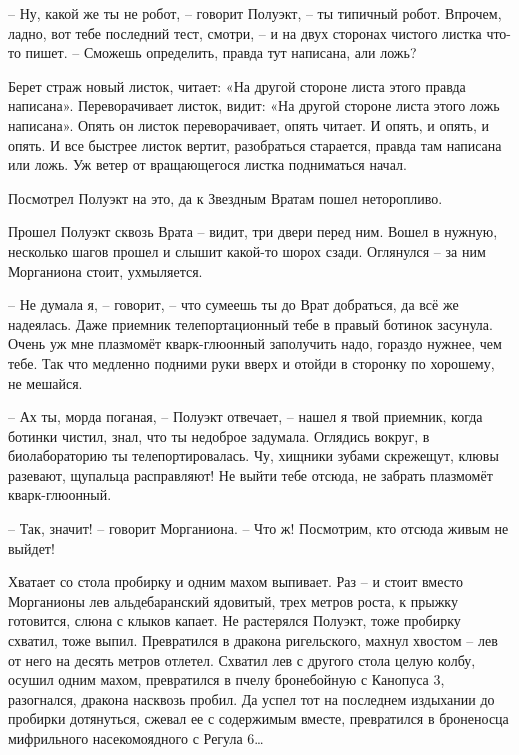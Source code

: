 \documentclass[ebook,oneside,final,openright]{memoir}
\begin{document}
– Ну, какой же ты не робот, – говорит Полуэкт, – ты типичный робот. Впрочем, ладно, вот тебе последний тест, смотри, – и на двух сторонах чистого листка что-то пишет. – Сможешь определить, правда тут написана, али ложь? \par
\par
Берет страж новый листок, читает: «На другой стороне листа этого правда написана». Переворачивает листок, видит: «На другой стороне листа этого ложь написана». Опять он листок переворачивает, опять читает. И опять, и опять, и опять. И все быстрее листок вертит, разобраться старается, правда там написана или ложь. Уж ветер от вращающегося листка подниматься начал. \par
\par
Посмотрел Полуэкт на это, да к Звездным Вратам пошел неторопливо.\par
\par
\par
Прошел Полуэкт сквозь Врата – видит, три двери перед ним. Вошел в нужную, несколько шагов прошел и слышит какой-то шорох сзади. Оглянулся – за ним Морганиона стоит, ухмыляется. \par
\par
– Не думала я, – говорит, – что сумеешь ты до Врат добраться, да всё же надеялась. Даже приемник телепортационный тебе в правый ботинок засунула. Очень уж мне плазмомёт кварк-глюонный заполучить надо, гораздо нужнее, чем тебе. Так что медленно подними руки вверх и отойди в сторонку по хорошему, не мешайся.\par
– Ах ты, морда поганая, – Полуэкт отвечает, – нашел я твой приемник, когда ботинки чистил, знал, что ты недоброе задумала. Оглядись вокруг, в биолабораторию ты телепортировалась. Чу, хищники зубами скрежещут, клювы разевают, щупальца расправляют! Не выйти тебе отсюда, не забрать плазмомёт кварк-глюонный.\par
– Так, значит! – говорит Морганиона. – Что ж! Посмотрим, кто отсюда живым не выйдет!\par
\par
Хватает со стола пробирку и одним махом выпивает. Раз – и стоит вместо Морганионы лев альдебаранский ядовитый, трех метров роста, к прыжку готовится, слюна с клыков капает. Не растерялся Полуэкт, тоже пробирку схватил, тоже выпил. Превратился в дракона ригельского, махнул хвостом – лев от него на десять метров отлетел. Схватил лев с другого стола целую колбу, осушил одним махом, превратился в пчелу бронебойную с Канопуса 3, разогнался, дракона насквозь пробил. Да успел тот на последнем издыхании до пробирки дотянуться, сжевал ее с содержимым вместе, превратился в броненосца мифрильного насекомоядного с Регула 6…\par
\end{document}
